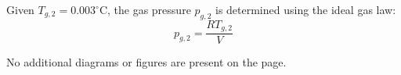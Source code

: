 Given \( T_{g,2} = 0.003^\circ\text{C} \), the gas pressure \( p_{g,2} \) is determined using the ideal gas law:  
\[
p_{g,2} = \frac{R T_{g,2}}{V}
\]  

No additional diagrams or figures are present on the page.